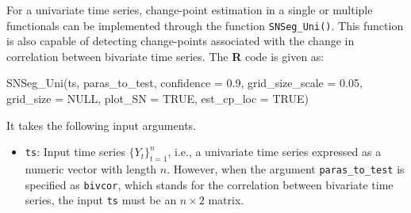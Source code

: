 For a univariate time series, change-point estimation in a single or multiple functionals can be implemented through the function \texttt{SNSeg\_Uni()}. This function is also capable of detecting change-points associated with the change in correlation between bivariate time series.  The \textbf{R} code is given as:
\begin{example}
SNSeg_Uni(ts, paras_to_test, confidence = 0.9, grid_size_scale = 0.05,
          grid_size = NULL, plot_SN = TRUE, est_cp_loc = TRUE)
\end{example}
It takes the following input arguments.
\begin{itemize}
	\item \texttt{ts}: Input time series $\{Y_t\}_{t=1}^n$, i.e., a univariate time series expressed as a numeric vector with length $n$. However, when the argument \texttt{paras\_to\_test} is specified as \texttt{bivcor}, which stands for the correlation between bivariate time series, the input \texttt{ts} must be an $n\times 2$ matrix.
	

\end{itemize}

